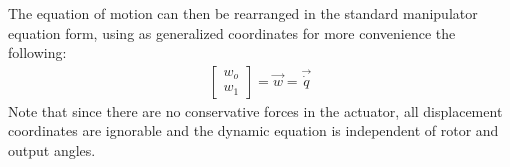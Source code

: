 %
The equation of motion can then be rearranged in the standard manipulator equation form, using as generalized coordinates for more convenience the following:
%
\begin{align}
\left[
\begin{array}{c}
w_o \\ w_1 
\end{array}
\right] = \vec{w} = \vec{\dot{q}} 
\end{align}
%
Note that since there are no conservative forces in the actuator, all displacement coordinates are ignorable and the dynamic equation is independent of rotor and output angles.
%

